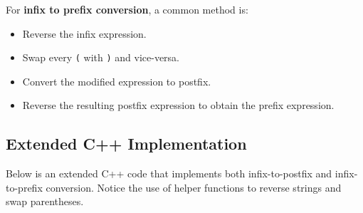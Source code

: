 For \textbf{infix to prefix conversion}, a common method is:
\begin{itemize}
    \item Reverse the infix expression.
    \item Swap every \texttt{(} with \texttt{)} and vice-versa.
    \item Convert the modified expression to postfix.
    \item Reverse the resulting postfix expression to obtain the prefix expression.
\end{itemize}

\subsection{Extended C++ Implementation}

Below is an extended C++ code that implements both infix-to-postfix and infix-to-prefix conversion. Notice the use of helper functions to reverse strings and swap parentheses.

